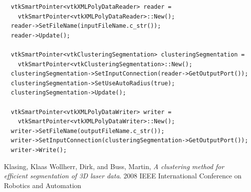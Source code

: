 \documentclass{InsightArticle}
\begin{document}
\begin{verbatim}
  vtkSmartPointer<vtkXMLPolyDataReader> reader = 
    vtkSmartPointer<vtkXMLPolyDataReader>::New();
  reader->SetFileName(inputFileName.c_str());
  reader->Update();

  vtkSmartPointer<vtkClusteringSegmentation> clusteringSegmentation =
    vtkSmartPointer<vtkClusteringSegmentation>::New();
  clusteringSegmentation->SetInputConnection(reader->GetOutputPort());
  clusteringSegmentation->SetUseAutoRadius(true);
  clusteringSegmentation->Update();

  vtkSmartPointer<vtkXMLPolyDataWriter> writer =
    vtkSmartPointer<vtkXMLPolyDataWriter>::New();
  writer->SetFileName(outputFileName.c_str());
  writer->SetInputConnection(clusteringSegmentation->GetOutputPort());
  writer->Write();
\end{verbatim}

\begin{thebibliography}{9}
	  Klasing, Klaas Wollherr, Dirk, and Buss, Martin,
	  \emph{A clustering method for efficient segmentation of 3D laser data}.
	  2008 IEEE International Conference on Robotics and Automation

\end{thebibliography}
\end{document}
